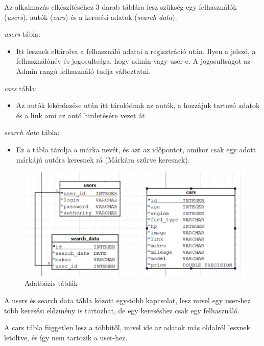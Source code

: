
Az alkalmazás elkészítéséhez 3 darab táblára lesz szükség egy
felhasználók (\textit{users}), autók (\textit{cars}) és a keresési adatok (\textit{search data}).

\textit{users} tábla:
\begin{itemize}
\item Itt lesznek eltárolva a felhasználó adatai a regisztráció után. Ilyen a jelszó, a felhasználónév és jogosultsága, hogy admin vagy user-e. A jogosultságot az Admin rangú felhasználó tudja változtatni.
\end{itemize}

\textit{cars} tábla:
\begin{itemize}
\item Az autók lekérdezése után itt tárolódnak az autók,  a hozzájuk tartozó adatok és a link ami az autó hirdetésére vezet át
\end{itemize}

\textit{search data} tábla:
\begin{itemize}
\item Ez a tábla tárolja a márka nevét, és azt az időpontot, amikor csak egy adott márkájú autóra keresnek rá (Márkára szűrve keresnek).
\end{itemize}
 
 \begin{figure}[h]
\centering
\includegraphics[scale=0.6]{images/Data_Table.png}
\caption{Adatbázis táblák}
\label{fig:DataTable}
\end{figure}

A users és search data tábla között egy-több kapcsolat, lesz mivel egy user-hez több keresési előzmény is tartozhat, de egy kereséshez csak egy felhasználó.

A cars tábla független lesz a többitől, mivel ide az adatok más oldalról lesznek letöltve, és így nem tartozik a user-hez.

